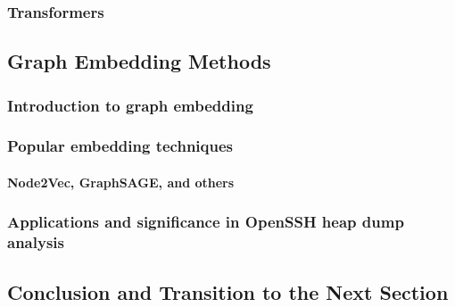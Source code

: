     \subsubsection{Transformers}
\subsection{Graph Embedding Methods}
    \subsubsection{Introduction to graph embedding}
    \subsubsection{Popular embedding techniques}
        \paragraph{Node2Vec, GraphSAGE, and others}
    \subsubsection{Applications and significance in OpenSSH heap dump analysis}

\subsection{Conclusion and Transition to the Next Section}
